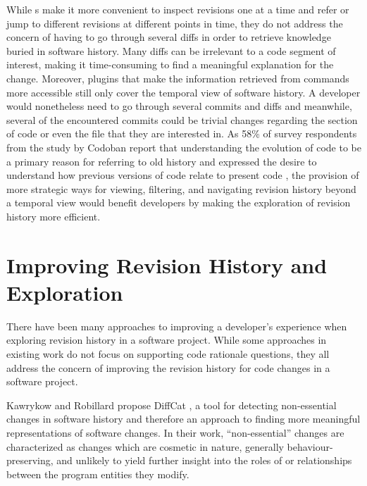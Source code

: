 While s make it more convenient to inspect revisions one at a time and refer 
or jump to different revisions at different points in time, they do not address the concern 
of having to go through several diffs
in order to retrieve knowledge buried in software history. 
Many diffs can be irrelevant to a code segment of interest, 
making it time-consuming to find a meaningful explanation for the change.
Moreover, plugins that make the information retrieved from  commands more 
accessible still only cover the temporal view of software history.
A developer would nonetheless need to go through several commits and diffs and meanwhile, 
several of the encountered commits could be trivial changes regarding the section of code 
or even the file that they are interested in.
As 58\% of survey respondents from the study by Codoban \etal report
that understanding the evolution of code to be a primary reason for
referring to old history and expressed the desire to
understand how previous versions of code relate to present code \cite{codoban_software_2015},
the provision of more strategic ways for viewing, filtering, and 
navigating revision history beyond a temporal view would benefit developers by 
making the exploration of revision history more efficient.


\section{Improving Revision History and Exploration}

There have been many approaches to improving a developer's experience when exploring revision history in a software project. 
While some approaches in existing work do not focus on supporting code rationale questions, 
they all address the concern of improving the revision history for code changes in a software project.

Kawrykow and Robillard propose DiffCat \cite{kawrykow_non-essential_2011}, 
a tool for detecting non-essential changes in software history and therefore an approach to finding 
more meaningful representations of software changes.
In their work, ``non-essential'' changes are characterized as changes which are cosmetic in nature, 
generally behaviour-preserving, and unlikely to yield further insight into the roles of or 
relationships between the program entities they modify.

